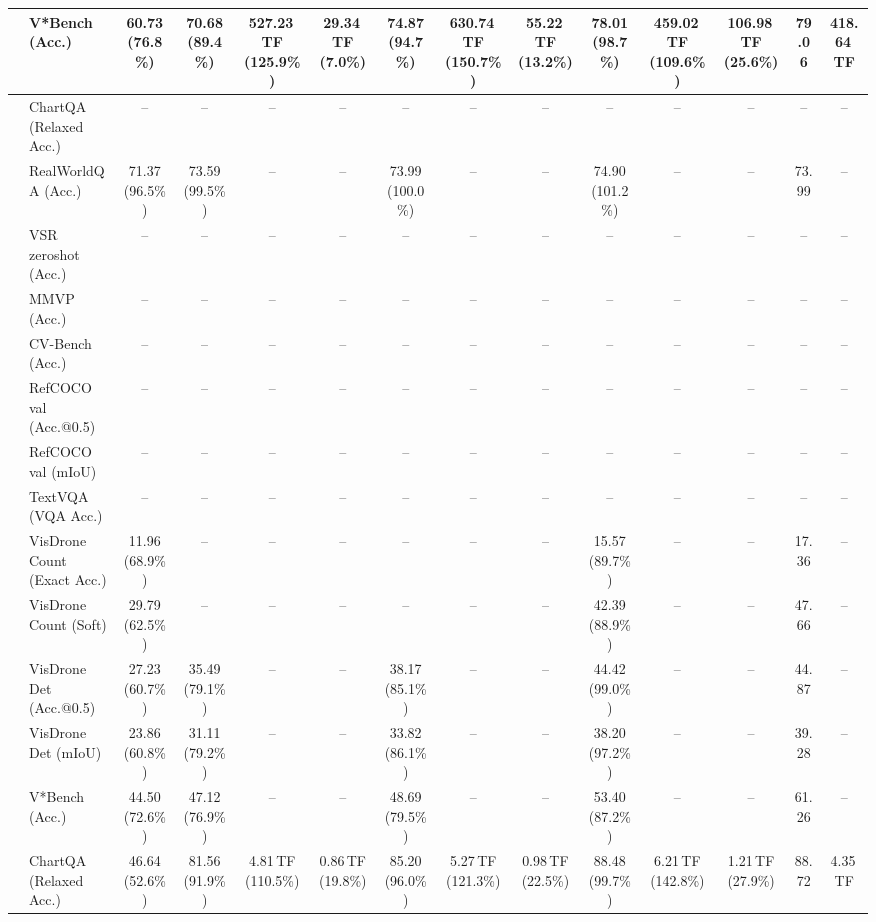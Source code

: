 \begin{table}[t]
\begin{center}
\begin{small}
\begin{sc}
{\begin{tabular}{llcccccccccccc}
& V*Bench (Acc.) & 60.73 (76.8\%) & 70.68 (89.4\%) & 527.23\,TF (125.9\%) & 29.34\,TF (7.0\%) & 74.87 (94.7\%) & 630.74\,TF (150.7\%) & 55.22\,TF (13.2\%) & 78.01 (98.7\%) & 459.02\,TF (109.6\%) & 106.98\,TF (25.6\%) & 79.06 & 418.64\,TF \\
\midrule
{}
& ChartQA (Relaxed Acc.) & -- & -- & -- & -- & -- & -- & -- & -- & -- & -- & -- & -- \\
& RealWorldQA (Acc.) & 71.37 (96.5\%) & 73.59 (99.5\%) & -- & -- & 73.99 (100.0\%) & -- & -- & 74.90 (101.2\%) & -- & -- & 73.99 & -- \\
& VSR zeroshot (Acc.) & -- & -- & -- & -- & -- & -- & -- & -- & -- & -- & -- & -- \\
& MMVP (Acc.) & -- & -- & -- & -- & -- & -- & -- & -- & -- & -- & -- & -- \\
& CV-Bench (Acc.) & -- & -- & -- & -- & -- & -- & -- & -- & -- & -- & -- & -- \\
& RefCOCO val (Acc.@0.5) & -- & -- & -- & -- & -- & -- & -- & -- & -- & -- & -- & -- \\
& RefCOCO val (mIoU) & -- & -- & -- & -- & -- & -- & -- & -- & -- & -- & -- & -- \\
& TextVQA (VQA Acc.) & -- & -- & -- & -- & -- & -- & -- & -- & -- & -- & -- & -- \\
& VisDrone Count (Exact Acc.) & 11.96 (68.9\%) & -- & -- & -- & -- & -- & -- & 15.57 (89.7\%) & -- & -- & 17.36 & -- \\
& VisDrone Count (Soft) & 29.79 (62.5\%) & -- & -- & -- & -- & -- & -- & 42.39 (88.9\%) & -- & -- & 47.66 & -- \\
& VisDrone Det (Acc.@0.5) & 27.23 (60.7\%) & 35.49 (79.1\%) & -- & -- & 38.17 (85.1\%) & -- & -- & 44.42 (99.0\%) & -- & -- & 44.87 & -- \\
& VisDrone Det (mIoU) & 23.86 (60.8\%) & 31.11 (79.2\%) & -- & -- & 33.82 (86.1\%) & -- & -- & 38.20 (97.2\%) & -- & -- & 39.28 & -- \\
& V*Bench (Acc.) & 44.50 (72.6\%) & 47.12 (76.9\%) & -- & -- & 48.69 (79.5\%) & -- & -- & 53.40 (87.2\%) & -- & -- & 61.26 & -- \\
\midrule
{}
& ChartQA (Relaxed Acc.) & 46.64 (52.6\%) & 81.56 (91.9\%) & 4.81\,TF (110.5\%) & 0.86\,TF (19.8\%) & 85.20 (96.0\%) & 5.27\,TF (121.3\%) & 0.98\,TF (22.5\%) & 88.48 (99.7\%) & 6.21\,TF (142.8\%) & 1.21\,TF (27.9\%) & 88.72 & 4.35\,TF \\

\end{tabular}}
\end{sc}
\end{small}
\end{center}
\end{table}
